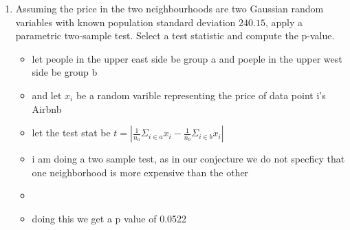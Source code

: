 \documentclass[12pt,twoside]{article}
\begin{document}
\begin{enumerate}
\begin{enumerate}
\item Assuming the price in the two neighbourhoods are two Gaussian random variables with known population standard deviation $240.15$, apply a parametric two-sample test. Select a test statistic and compute the p-value.
\begin{itemize}
  \color{blue}
  \item let people in the upper east side be group a and poeple in the upper west side be group b 
  \item and let $x_i$ be a random varible representing the price of data point i's Airbnb
  \item let the test stat be $t=|\frac{1}{n_{a}}\Sigma_{i\in a}x_i-\frac{1}{n_{b}}\Sigma_{i\in b}x_i|$
  \item i am doing a two sample test, as in our conjecture we do not specficy that one neighborhood is more expensive than the other
    \item \inputminted[firstline=106, lastline=111, breaklines=True]{python}{hw7.py}
  \item doing this we get a p value of 0.0522
\end{itemize}


\end{enumerate}
\end{enumerate}
\end{document}
